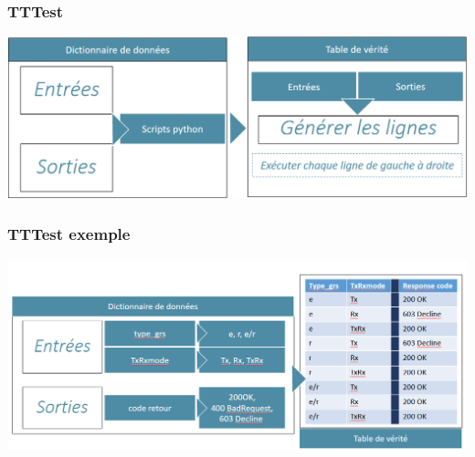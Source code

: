 \begin{frame}
    \frametitle{TTTest}
    \begin{center}
        \includegraphics[width=1\textwidth]{./img/tttest.png}
    \end{center}
\end{frame}

\begin{frame}
    \frametitle{TTTest exemple}
    \begin{center}
        \includegraphics[width=1\textwidth]{./img/tttest_example.png}
    \end{center}
\end{frame}